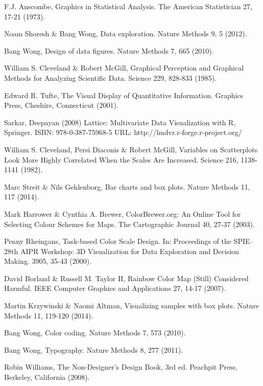 \documentclass[letterpaper]{article}\usepackage[]{graphicx}\usepackage[]{color}
\begin{document}
\begin{thebibliography}{1}
F.J. Anscombe, Graphics in Statistical Analysis. The American Statistician 27, 17-21 (1973).

Noam Shoresh \& Bang Wong, Data exploration. Nature Methods 9, 5 (2012).

Bang Wong, Design of data figures. Nature Methods 7, 665 (2010).

William S. Cleveland \& Robert McGill, Graphical Perception and Graphical Methods for Analyzing Scientific Data. Science 229, 828-833 (1985).

Edward R. Tufte, The Visual Display of Quantitative Information. Graphics Press, Cheshire, Connecticut (2001).

Sarkar, Deepayan (2008) Lattice: Multivariate Data Visualization with R, Springer.  ISBN: 978-0-387-75968-5 URL: http://lmdvr.r-forge.r-project.org/

William S. Cleveland, Persi Diaconis \& Robert McGill, Variables on Scatterplots Look More Highly Correlated When the Scales Are Increased. Science 216, 1138-1141 (1982).

Marc Streit \& Nils Gehlenborg, Bar charts and box plots. Nature Methods 11, 117 (2014).

Mark Harrower \& Cynthia A. Brewer, ColorBrewer.org: An Online Tool for Selecting Colour Schemes for Maps. The Cartographic Journal 40, 27-37 (2003).

Penny Rheingans, Task-based Color Scale Design. In: Proceedings of the SPIE--28th AIPR Workshop: 3D Visualization for Data Exploration and Decision Making. 3905, 35-43 (2000).

David Borland \& Russell M. Taylor II, Rainbow Color Map (Still) Considered Harmful. IEEE Computer Graphics and Applications 27, 14-17 (2007).

Martin Krzywinski \& Naomi Altman, Visualizing samples with box plots. Nature Methods 11, 119-120 (2014).

Bang Wong, Color coding. Nature Methods 7, 573 (2010).

Bang Wong, Typography. Nature Methods 8, 277 (2011).

Robin Williams, The Non-Designer's Design Book, 3rd ed. Peachpit Press, Berkeley, California (2008).


\end{thebibliography}
\end{document}
